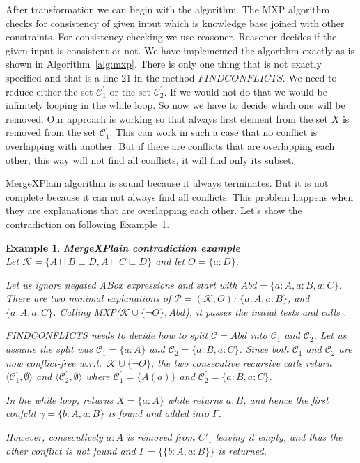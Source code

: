 \documentclass[12pt,a4paper]{article}
\newtheorem{example}{Example}[subsection]
\begin{document}
After transformation we can begin with the algorithm. The MXP algorithm checks for consistency of given input which is knowledge base joined with other constraints. For consistency checking we use reasoner. Reasoner decides if the given input is consistent or not. We have implemented the algorithm exactly as is shown in Algorithm~\ref{alg:mxp}. There is only one thing that is not exactly specified and that is a line 21 in the method $\mathit{FINDCONFLICTS}$. We need to reduce either the set $\mathcal{C}^{\prime}_{1}$ or the set $\mathcal{C}^{\prime}_{2}$. If we would not do that we would be infinitely looping in the while loop. So now we have to decide which one will be removed. Our approach is working so that always first element from the set $X$ is removed from the set $\mathcal{C}^{\prime}_{1}$. This can work in such a case that no conflict is overlapping with another. But if there are conflicts that are overlapping each other, this way will not find all conflicts, it will find only its subset. 

MergeXPlain algorithm is sound because it always terminates. But it is not complete because it can not always find all conflicts. This problem happens when they are explanations that are overlapping each other. Let's show the contradiction on following Example~\ref{example:mxpContradiction}.

\begin{example}{\textbf{MergeXPlain contradiction example}}
	\label{example:mxpContradiction}
	\\
	Let $\mathcal{K} = \{ A \sqcap B \sqsubseteq D, A \sqcap C \sqsubseteq D\}$ and let $O = \{ a:D \}$. 
	
	Let us ignore negated ABox expressions and start with $Abd = \{ a:A, a:B,
	a:C \}$. There are two minimal explanations of $\mathcal{P} = (\mathcal{K},O)$: $\{ a:A, a:B \}$, and	$\{ a:A, a:C \}$. Calling MXP($\mathcal{K} \cup \{\neg O\}, Abd$), it passes the
	initial tests and calls .
	
	\textsc{FINDCONFLICTS} needs to decide how to split $\mathcal{C} = Abd$ into $\mathcal{C}_{1}$
	and $\mathcal{C}_{2}$. Let us assume the split was $\mathcal{C}_{1} = \{ a:A \}$ and $\mathcal{C}_{2} =
	\{ a:B, a:C \}$. Since both $\mathcal{C}_{1}$ and $\mathcal{C}_{2}$ are now conflict-free w.r.t.\
	$\mathcal{K} \cup \{\neg O\}$, the two consecutive recursive calls return
	$\langle \mathcal{C}^{\prime}_{1},\emptyset \rangle$ and $\langle \mathcal{C}^{\prime}_{2},\emptyset \rangle$ where
	$\mathcal{C}^{\prime}_{1}=\{A(a)\}$ and $\mathcal{C}^{\prime}_{2}=\{ a:B, a:C \}$.
	
	In the while loop, \Call{GETCONFLICT}{$\mathcal{K} \cup \{\neg O\}\cup
		\{a:B,a:C\},$ $\{a:B,a:C\},$ $\{a:A\}$} returns $X = \{a:A\}$ while
	 returns $a:B$, and hence the first
	confclit $\gamma = \{b:A,a:B\}$ is found and added into $\Gamma$.
	
	However, consecutively $a:A$ is removed from $C'_1$ leaving it empty,
	and thus the other conflict is not found and $\Gamma = \{\{b:A,a:B\}\}$ is
	returned.	
\end{example}
\end{document}

